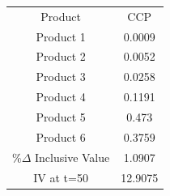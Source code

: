\begin{tabular}{cc}
Product & CCP \\
Product 1 & 0.0009 \\
Product 2 & 0.0052 \\
Product 3 & 0.0258 \\
Product 4 & 0.1191 \\
Product 5 & 0.473 \\
Product 6 & 0.3759 \\
$\%\Delta$ Inclusive Value & 1.0907 \\
IV at t=50 & 12.9075 \\
\end{tabular}